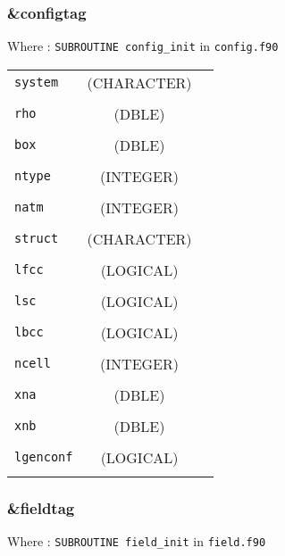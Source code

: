 \documentclass[10pt,a4paper]{article}
\begin{document}
\subsubsection{\&configtag}

Where : \verb?SUBROUTINE config_init? in \verb?config.f90?

\begin{tabular}{lcc}
\\
\verb?system? & (CHARACTER) & \\
\\
\verb?rho? & (DBLE)  & \\
\\
\verb?box? & (DBLE)  & \\
\\
\verb?ntype? & (INTEGER)  & \\
\\
\verb?natm? & (INTEGER) & \\
\\
\verb?struct? & (CHARACTER) & \\
\\
\verb?lfcc? & (LOGICAL) & \\
\\
\verb?lsc? & (LOGICAL) & \\
\\
\verb?lbcc? & (LOGICAL) & \\
\\
\verb?ncell? & (INTEGER) & \\
\\
\verb?xna? & (DBLE) & \\
\\
\verb?xnb? & (DBLE) & \\
\\
\verb?lgenconf? & (LOGICAL) & \\
\\
\end{tabular}


\subsubsection{\&fieldtag}

Where : \verb?SUBROUTINE field_init? in \verb?field.f90?
\end{document}
